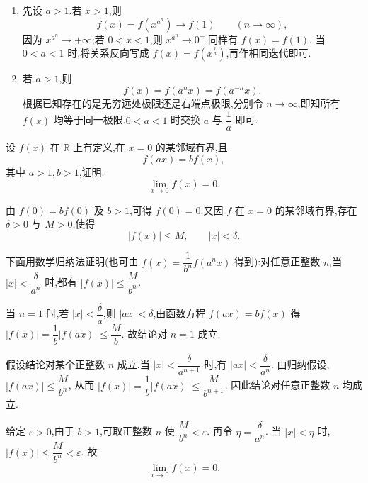 \begin{solution}
    \leavevmode
    \begin{enumerate}
        \item 先设 $a>1$.若 $x>1$,则
              \[
                  f(x)=f\left(x^{a^n}\right)\longrightarrow f(1)
                  \qquad(n\to\infty),
              \]
              因为 $x^{a^n}\to+\infty$;若 $0<x<1$,则 $x^{a^n}\to0^+$,同样有 $f(x)=f(1)$.
              当 $0<a<1$ 时,将关系反向写成 $f(x)=f\left(x^{\frac{1}{a}}\right)$,再作相同迭代即可.
        \item 若 $a>1$,则
              \[
                  f(x)=f(a^nx)=f(a^{-n}x).
              \]
              根据已知存在的是无穷远处极限还是右端点极限,分别令 $n\to\infty$,即知所有 $f(x)$ 均等于同一极限.$0<a<1$ 时交换 $a$ 与 $\dfrac{1}{a}$ 即可.
    \end{enumerate}
\end{solution}

\begin{example}
    设 $f(x)$ 在 $\mathbb{R}$ 上有定义,在 $x=0$ 的某邻域有界,且
    \[
        f(ax)=bf(x),
    \]
    其中 $a>1,b>1$,证明:
    \[
        \displaystyle\lim\limits_{x\to0}f(x)=0.
    \]
\end{example}
\exampleblank

\begin{solution}
    由 $f(0)=bf(0)$ 及 $b>1$,可得 $f(0)=0$.又因 $f$ 在 $x=0$ 的某邻域有界,存在 $\delta>0$ 与 $M>0$,使得
    \[
        |f(x)|\leq M,
        \qquad
        |x|<\delta.
    \]

    下面用数学归纳法证明(也可由 $f(x)=\dfrac{1}{b^n}f(a^n x)$ 得到):对任意正整数 $n$,当 $|x|<\dfrac{\delta}{a^n}$ 时,都有 $|f(x)|\leq\dfrac{M}{b^n}$.

    当 $n=1$ 时,若 $|x|<\dfrac{\delta}{a}$,则 $|ax|<\delta$,由函数方程 $f(ax)=bf(x)$ 得 $|f(x)|
        =\dfrac{1}{b}|f(ax)| \leq\dfrac{M}{b}$. 故结论对 $n=1$ 成立.

    假设结论对某个正整数 $n$ 成立.当 $|x|<\dfrac{\delta}{a^{n+1}}$ 时,有 $|ax|<\dfrac{\delta}{a^n}$. 由归纳假设,
    $|f(ax)|\leq\dfrac{M}{b^n}$, 从而 $|f(x)| =\dfrac{1}{b}|f(ax)| \leq\dfrac{M}{b^{n+1}}$.
    因此结论对任意正整数 $n$ 均成立.

    给定 $\varepsilon>0$,由于 $b>1$,可取正整数 $n$ 使 $\dfrac{M}{b^n}<\varepsilon$. 再令
    $\eta=\dfrac{\delta}{a^n}$. 当 $|x|<\eta$ 时, $|f(x)|\leq\dfrac{M}{b^n}<\varepsilon$.
    故
    \[
        \displaystyle\lim\limits_{x\to0}f(x)=0.
    \]
\end{solution}

